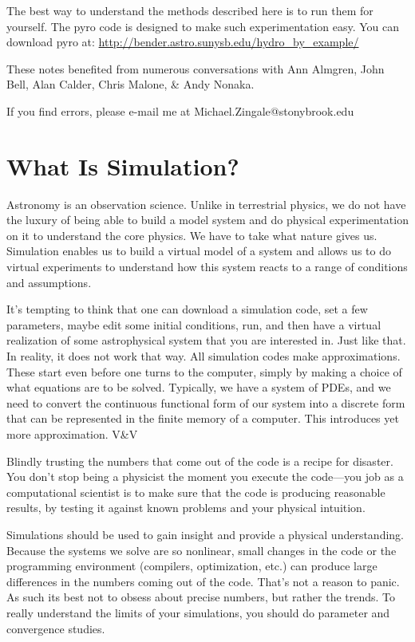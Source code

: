 \documentclass[11pt]{book}
\begin{document}
The best way to understand the methods described here is to run
them for yourself.  The {\sf pyro} code is designed to make such
experimentation easy.  You can download {\sf pyro} at: 
\url{http://bender.astro.sunysb.edu/hydro_by_example/}

These notes benefited from numerous conversations with Ann Almgren,
John Bell, Alan Calder, Chris Malone, \& Andy Nonaka.

If you find errors, please e-mail me at Michael.Zingale@stonybrook.edu

\clearpage

\mainmatter


\chapter{What Is Simulation?}

Astronomy is an observation science.
Unlike in terrestrial physics, we do not have the luxury of being able
to build a model system and do physical experimentation on it to understand
the core physics.  We have to take what nature gives us.
Simulation enables us to build a virtual model of a system and allows us
to do virtual experiments to understand how this system reacts to a range
of conditions and assumptions.  

It's tempting to think that one can download a simulation code, set a
few parameters, maybe edit some initial conditions, run, and then have
a virtual realization of some astrophysical system that you are
interested in.  Just like that.  In reality, it does not work that
way.  All simulation codes make approximations.  These start even
before one turns to the computer, simply by making a choice of what
equations are to be solved.  Typically, we have a system of PDEs,
and we need to convert the continuous functional form of our system
into a discrete form that can be represented in the finite memory of 
a computer.  This introduces yet more approximation.  V\&V

Blindly trusting the numbers that come out of the code is a recipe
for disaster.  You don't stop being a physicist the moment you execute
the code---you job as a computational scientist is to make sure that
the code is producing reasonable results, by testing it against known
problems and your physical intuition.  

Simulations should be used to gain insight and provide a physical
understanding.  
Because the systems we solve are so nonlinear, small changes in the
code or the programming environment (compilers, optimization, etc.)
can produce large differences in the numbers coming out of the code.
That's not a reason to panic.
As such its best not to obsess about precise numbers, but rather the
trends.  To really understand the limits of your simulations, you
should do parameter and convergence studies.
\end{document}
